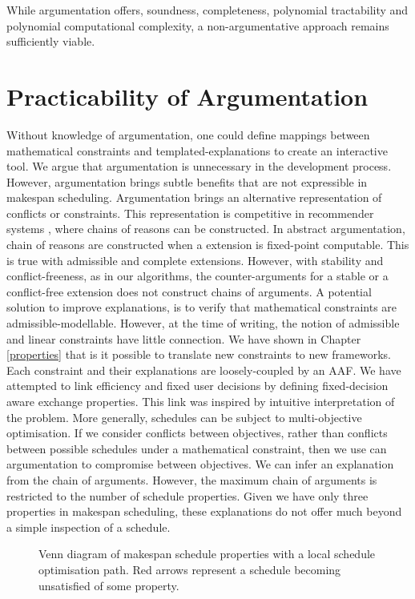 While argumentation offers, soundness, completeness, polynomial tractability and polynomial computational complexity, a non-argumentative approach remains sufficiently viable.

\section{Practicability of Argumentation}

Without knowledge of argumentation, one could define mappings between mathematical constraints and templated-explanations to create an interactive tool. We argue that argumentation is unnecessary in the development process. However, argumentation brings subtle benefits that are not expressible in makespan scheduling.
\linespace
Argumentation brings an alternative representation of conflicts or constraints. This representation is competitive in recommender systems \cite{recommend}, where chains of reasons can be constructed. In abstract argumentation, chain of reasons are constructed when a extension is fixed-point computable. This is true with admissible and complete extensions. However, with stability and conflict-freeness, as in our algorithms, the counter-arguments for a stable or a conflict-free extension does not construct chains of arguments. A potential solution to improve explanations, is to verify that mathematical constraints are admissible-modellable. However, at the time of writing, the notion of admissible and linear constraints have little connection. 
\linespace
We have shown in Chapter \ref{properties} that is it possible to translate new constraints to new frameworks. Each constraint and their explanations are loosely-coupled by an AAF. We have attempted to link efficiency and fixed user decisions by defining fixed-decision aware exchange properties. This link was inspired by intuitive interpretation of the problem. More generally, schedules can be subject to multi-objective optimisation. If we consider conflicts between objectives, rather than conflicts between possible schedules under a mathematical constraint, then we use can argumentation to compromise between objectives. We can infer an explanation from the chain of arguments. However, the maximum chain of arguments is restricted to the number of schedule properties. Given we have only three properties in makespan scheduling, these explanations do not offer much beyond a simple inspection of a schedule.

\begin{figure}[H]
	\label{problempath}
	
	\caption{Venn diagram of makespan schedule properties with a local schedule optimisation path. Red arrows represent a schedule becoming unsatisfied of some property.}
\end{figure}

